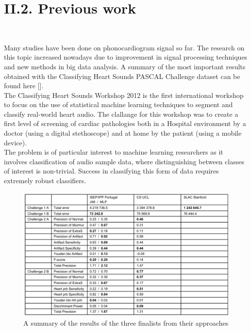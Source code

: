 \documentclass[11pt, a4papper]{report}
\theoremstyle{plain}
\theoremstyle{definition}
\theoremstyle{definition}
\theoremstyle{proposition}
\begin{document}
\section*{II.2. Previous work}
\

Many studies have been done on phonocardiogram signal so far. The research on this topic increased nowadays due to improvement in signal processing techniques and new methods in big data analysis. A summary of the most important results obtained with the Classifying Heart Sounds PASCAL Challenge dataset can be found here [].
\\

The Classifying Heart Sounds Workshop 2012 is the first international workshop to focus on the use of statistical machine learning techniques to segment and classify real-world heart audio. The clallange for this workshop was to create a first level of screening of cardiac pathologies both in a Hospital environment by a doctor (using a digital stethoscope) and at home by the patient (using a mobile device). 
\\

The problem is of particular interest to machine learning researchers as it involves classification of audio sample data, where distinguishing between classes of interest is non-trivial. Success in classifying this form of data requires extremely robust classifiers. 
\\

\begin{figure}[h]
\includegraphics[width=14.5cm]{challengeresults.png}
\centering
\caption{A summary of the results of the three finalists from their approaches}
\end{figure}
\end{document}

